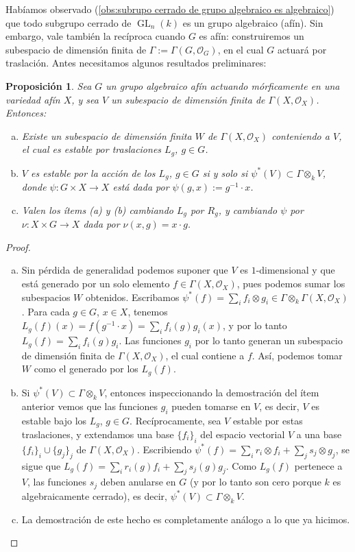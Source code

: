 \documentclass[spanish,12pt]{amsart}
\newtheorem{proposition}[theorem]{Proposición}
\theoremstyle{definition}
\theoremstyle{remark}
\numberwithin{equation}{section}
\renewcommand{\O}{\mathcal{O}}
\begin{document}
Habíamos observado (\ref{obs:subrupo cerrado de grupo algebraico es algebraico}) que todo subgrupo cerrado de $\operatorname{GL}_n (k)$ es un grupo algebraico (afín). Sin embargo, vale también la recíproca cuando $G$ es afín: construiremos un subespacio de dimensión finita de $\Gamma := \Gamma (G, \O_G)$, en el cual $G$ actuará por traslación. Antes necesitamos algunos resultados preliminares:

\begin{proposition}
Sea $G$ un grupo algebraico afín actuando mórficamente en una variedad afín $X$, y sea $V$ un subespacio de dimensión finita de $\Gamma(X, \O_X)$. Entonces:
\begin{enumerate}[(a)]
\item Existe un subespacio de dimensión finita $W$ de $\Gamma (X,\O_X)$ conteniendo a $V$, el cual es estable por traslaciones $L_g$, $g \in G$.
\item $V$ es estable por la acción de los $L_g$, $g \in G$ si y solo si $\psi^{*} (V) \subset \Gamma \otimes_k V$, donde $\psi : G \times X \to X$ está dada por $\psi (g,x) := g^{-1} \cdot x$.
\item Valen los ítems (a) y (b) cambiando $L_g$ por $R_g$, y cambiando $\psi$ por $\nu : X \times G \to X$ dada por $\nu (x, g) = x \cdot g$.
\end{enumerate}
\end{proposition}
\begin{proof}
\begin{enumerate}[(a)]
\item Sin pérdida de generalidad podemos suponer que $V$ es $1$-dimensional y que está generado por un solo elemento $f \in \Gamma (X, \O_X)$, pues podemos sumar los subespacios $W$ obtenidos. Escribamos $\psi^* (f) = \sum_i f_i \otimes g_i \in \Gamma \otimes_k \Gamma (X, \O_X)$. Para cada $g\in G$, $x \in X$, tenemos $L_g (f) (x) = f(g^{-1} \cdot x) = \sum_i f_i (g) g_i (x)$, y por lo tanto $L_g (f) = \sum_i f_i (g) g_i$. Las funciones $g_i$ por lo tanto generan un subespacio de dimensión finita de $\Gamma (X, \O_X)$, el cual contiene a $f$. Así, podemos tomar $W$ como el generado por los $L_g (f)$.
\item Si $\psi^* (V) \subset \Gamma \otimes_k V$, entonces inspeccionando la demostración del ítem anterior vemos que las funciones $g_i$  pueden tomarse en $V$, es decir, $V$ es estable bajo los $L_g$, $g \in G$. Recíprocamente, sea $V$ estable por estas traslaciones, y extendamos una base $\{f_i\}_i$ del espacio vectorial $V$ a una base $\{f_i\}_i \cup \{g_j\}_j$ de $\Gamma (X, \O_X)$. Escribiendo $\psi^* (f) = \sum_i r_i \otimes f_i + \sum_j s_j \otimes g_j$, se sigue que $L_g (f) = \sum_i r_i (g) f_i + \sum_j s_j (g) g_j$. Como $L_g (f)$ pertenece a $V$, las funciones $s_j$ deben anularse en $G$ (y por lo tanto son cero porque $k$ es algebraicamente cerrado), es decir, $\psi^* (V) \subset \Gamma \otimes_k V$.
\item La demostración de este hecho es completamente análogo a lo que ya hicimos.
\end{enumerate}
\end{proof}
\end{document}
